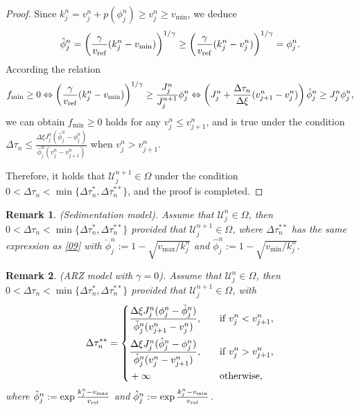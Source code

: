\documentclass[times,final,11pt]{elsarticle}
\newtheorem{remark}{Remark}[section]
\numberwithin{equation}{section}
\theoremstyle{definition}
\theoremstyle{remark}
\begin{document}
\begin{proof}
	Since $k_j^n = v_j^n + p(\phi_j^n) \geq v_j^n \geq v_{\min}$, we deduce
	\begin{equation*}
	    \hat{\phi}_j^n = \left(\frac{\gamma}{v_{\rm ref}} (k_j^n - v_{\min})\right)^{1 / \gamma} \geq \left(\frac{\gamma}{v_{\rm ref}} (k_j^n - v_j^n)\right)^{1 / \gamma} = \phi_j^n. 
	\end{equation*}
	According the relation 
	\begin{equation*}
	    f_{\min} \geq 0 \Leftrightarrow \left(\frac{\gamma}{v_{\rm ref}} (k_j^n - v_{\min})\right)^{1 / \gamma} \geq \frac{J_j^n}{J_j^{n + 1}} \phi_j^n \Leftrightarrow \left( J_j^n + \frac{\Delta \tau_n}{\Delta \xi} (v_{j + 1}^n - v_j^n) \right) \hat{\phi}_j^n \geq J_j^n \phi_j^n,
	\end{equation*}
	we can obtain $f_{\min} \geq 0$ holds for any $v_j^n \leq v_{j + 1}^n$, and is true under the condition $\Delta \tau_n \leq \frac{\Delta \xi J_j^n (\hat{\phi}_j^n - \phi_j^n)}{\hat{\phi}_j^n (v_{j}^n - v_{j + 1}^n)}$ when $v_j^n > v_{j + 1}^n$. 

	Therefore, it holds that $\boldsymbol{\mathcal{U}}_j^{n + 1} \in \Omega$ under the condition $0 < \Delta \tau_n < \min \{\Delta \tau_n^{*}, \Delta \tau_n^{**} \}$, and the proof is completed.
\end{proof}

\begin{remark}
	{\rm (Sedimentation model).} Assume that $\boldsymbol{\mathcal{U}}_j^{n} \in \Omega$, then $0 < \Delta \tau_n < \min \{\Delta \tau_n^{*}, \Delta \tau_n^{**} \}$ provided that $\boldsymbol{\mathcal{U}}_j^{n + 1} \in \Omega$, where $\Delta \tau_n^{**}$ has the same expression as \eqref{09}
	with $\check{\phi}_j^n := 1 - \sqrt{v_{\max} / k_j^n}$ and $\hat{\phi}_j^n := 1 - \sqrt{v_{\min} / k_j^n}$.
\end{remark}

\begin{remark}
	{\rm (ARZ model with $\gamma = 0$).} Assume that $\boldsymbol{\mathcal{U}}_j^{n} \in \Omega$, then $0 < \Delta \tau_n < \min \{\Delta \tau_n^{*}, \Delta \tau_n^{**} \}$ provided that $\boldsymbol{\mathcal{U}}_j^{n + 1} \in \Omega$, with 
	\begin{equation*}
	    \Delta \tau_n^{**} = \left\{ 
	    \begin{aligned}
	        &\frac{\Delta \xi J_j^n (\phi_j^n - \check{\phi}_j^n)}{\check{\phi}_j^n (v_{j + 1}^n - v_{j}^n)}, \quad &&{\rm if} \; v_j^n < v_{j + 1}^n ,\\
	        &\frac{\Delta \xi J_j^n (\hat{\phi}_j^n - \phi_j^n)}{\hat{\phi}_j^n (v_{j}^n - v_{j + 1}^n)}, \quad &&{\rm if} \; v_j^n > v_{j + 1}^n,\\
	        &+ \infty \quad &&{\rm otherwise},
	    \end{aligned}
	    \right.
	\end{equation*}
	where $\check{\phi}_j^n := \exp{\frac{k_j^n - v_{\max}}{v_{\rm ref}}}$ and $\hat{\phi}_j^n := \exp{\frac{k_j^n - v_{\min}}{v_{\rm ref}}}$.
\end{remark}
\end{document}
